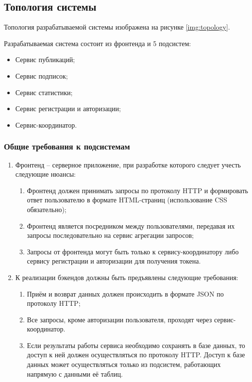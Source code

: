 \documentclass{bmstu-gost-7-32}
\begin{document}
\subsection{Топология системы}

Топология разрабатываемой системы изображена на рисунке \ref{img:topology}.


Разрабатываемая система состоит из фронтенда и 5 подсистем:
\begin{itemize}
	\item Сервис публикаций;
	\item Сервис подписок;
	\item Сервис статистики;
	\item Сервис регистрации и авторизации;
	\item Сервис-координатор.
\end{itemize}

\subsubsection{Общие требования к подсистемам}

\begin{enumerate}
	\item Фронтенд – серверное приложение, при разработке которого
	следует учесть следующие нюансы:
	\begin{enumerate}
		\item Фронтенд должен принимать запросы по протоколу HTTP и формировать ответ пользователю в формате HTML-страниц (использование CSS обязательно);
		\item Фронтенд является посредником между пользователями, передавая их запросы последовательно на сервис агрегации запросов;
		\item Запросы от фронтенда могут быть только к сервису-координатору либо сервису регистрации и авторизации для получения токена.
	\end{enumerate}
	\item К реализации бэкендов должны быть предъявлены следующие
	требования:
	\begin{enumerate}
		\item Приём и возврат данных должен происходить в формате JSON по протоколу HTTP;
		\item Все запросы, кроме авторизации пользователя, проходят через сервис-координатор.
		\item Если результаты работы сервиса необходимо сохранять в базе данных, то доступ к ней должен осуществляться по протоколу HTTP.
		Доступ к базе данных может осуществляться только из
		подсистем, работающих напрямую с данными её таблиц.
	\end{enumerate}
\end{enumerate}
\end{document}
